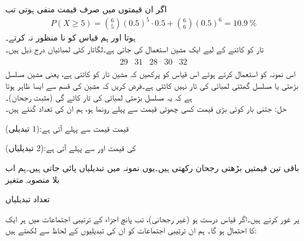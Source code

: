 اگر ان  قیمتوں میں صرف  قیمت منفی ہوتی تب
\begin{align*}
P(X\ge 5)=\binom{6}{5}(0.5)^5\cdot 0.5+\binom{6}{6}(0.5)^6=\SI{10.9}{\percent}
\end{align*}
ہوتا اور ہم قیاس کو نا منظور نہ کرتے۔
\quad {}\\
تار کو کاٹنے کے لیے ایک مشین استعمال کی جاتی ہے۔لگاتار کٹی لمبائیاں درج ذیل ہیں۔
\begin{align*}
\begin{array}{ccccc}
29&31&28&30&32
\end{array}
\end{align*} 
اس نمونہ کو استعمال کرتے ہوئے اس قیاس کو پرکھیں کہ مشین تار کو  کاٹتی ہے، یعنی مشین مسلسل بڑھتی یا مسلسل گھٹتی لمبائی کی تار نہیں کاٹتی ہے۔فرض کریں کہ مشین کی قسم سے ایسا ظاہر ہوتا ہے کہ یہ مسلسل بڑھتی لمبائی کی تار کاٹے گی (مثبت رجحان)۔\\
حل:\quad
جتنی بار کوئی بڑی قیمت کسی چھوٹی قیمت سے پہلے رونما ہو، ہم ان  کی تعداد گنتے ہیں۔\\
\centerline{
 قیمت  قیمت سے پہلے آتی ہے:\quad  ($1$ تبدیلی)
}
\centerline{
 کی قیمت  اور  سے پہلے آتی ہے:\quad  ($2$ تبدیلیاں)
}
باقی تین قیمتیں بڑھتی رجحان رکھتی ہیں۔یوں نمونہ میں  تبدیلیاں پائی جاتی ہیں۔ہم اب بلا منصوبہ متغیر\\
\centerline{
تعداد تبدیلیاں
}
پر غور کرتے ہیں۔اگر قیاس درست ہو (غیر رجحانی)، تب پانچ اجزاء  کے  ترتیبی اجتماعات میں ہر ایک کا احتمال
  ہو گا۔ ہم ان ترتیبی اجتماعات کو ان کی تبدیلیوں کے لحاظ سے لکھتے ہیں: 
